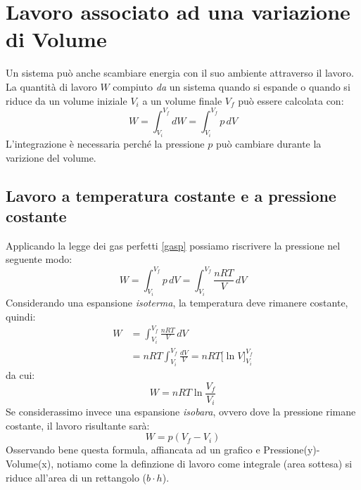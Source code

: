     \section{Lavoro associato ad una variazione di Volume} Un sistema può anche
    scambiare energia con il suo ambiente attraverso il lavoro. La quantità di 
    lavoro $W$ compiuto \textit{da} un sistema quando si espande o quando si 
    riduce da un volume iniziale $V_i$ a un volume finale $V_f$ può essere 
    calcolata con:
        \begin{equation}
            W = \int_{V_i}^{V_f} dW =  \int_{V_i}^{V_f} p \,dV  
        \end{equation}
    L'integrazione è necessaria perché la pressione $p$ può cambiare durante la
    varizione del volume.
        \subsection{Lavoro a temperatura costante e a pressione costante} 
        Applicando la legge dei gas perfetti \ref{gasp} possiamo riscrivere 
        la pressione nel seguente modo:
            \begin{equation*}
                W =  \int_{V_i}^{V_f} p \,dV =  \int_{V_i}^{V_f} 
                \frac{nRT}{V}\,dV 
            \end{equation*}
        Considerando una espansione \textit{isoterma}, la temperatura deve
        rimanere costante, quindi:
            \begin{align*}
                W &= \int_{V_i}^{V_f}\frac{nRT}{V}\,dV \\
                &= nRT \int_{V_i}^{V_f}\frac{dV}{V} 
                = nRT \Bigg[ \ln V \Bigg]_{V_i}^{V_f}
            \end{align*}
        da cui:
            \begin{equation}
                W = nRT \ln \frac{V_f}{V_i}
            \end{equation}
        Se considerassimo invece una espansione \textit{isobara}, ovvero dove 
        la pressione rimane costante, il lavoro risultante sarà:
            \begin{equation}
                W = p(V_f - V_i)
            \end{equation}
        Osservando bene questa formula, affiancata ad un grafico e
        Pressione(y)-Volume(x), notiamo come la definzione di lavoro come 
        integrale (area sottesa) si riduce all'area di un rettangolo 
        ($b\cdot h$).

